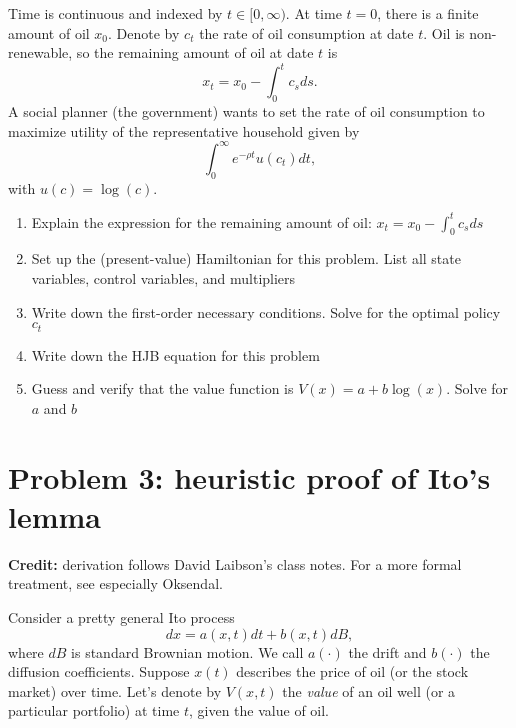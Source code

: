\documentclass[11pt]{extarticle}
\theoremstyle{plain}
\theoremstyle{definition}
\begin{document}
\vspace{5mm}
\noindent
Time is continuous and indexed by $t \in [0, \infty)$. At time $t=0$, there is a finite amount of oil $x_0$. Denote by $c_t$ the rate of oil consumption at date $t$. Oil is non-renewable, so the remaining amount of oil at date $t$ is 
\begin{equation*}
	x_t = x_0 - \int_0^t c_s ds.
\end{equation*}
A social planner (the government) wants to set the rate of oil consumption to maximize utility of the representative household given by
\begin{equation*}
	\int_0^\infty e^{- \rho t} u(c_t) dt,
\end{equation*}
with $u(c) = \log(c)$. 

\begin{enumerate}
\item Explain the expression for the remaining amount of oil: $x_t = x_0 - \int_0^t c_s ds$

\item Set up the (present-value) Hamiltonian for this problem. List all state variables, control variables, and multipliers

\item Write down the first-order necessary conditions. Solve for the optimal policy $c_t$

\item Write down the HJB equation for this problem

\item Guess and verify that the value function is $V(x) = a + b \log(x)$. Solve for $a$ and $b$
\end{enumerate}




\vspace{10mm}
\section*{Problem 3: heuristic proof of Ito's lemma}

\textbf{Credit:} derivation follows David Laibson's class notes. For a more formal treatment, see especially Oksendal. 

\vspace{5mm}
\noindent
Consider a pretty general Ito process
\begin{equation*}
	dx = a(x, t) dt + b(x, t) dB,
\end{equation*}
where $dB$ is standard Brownian motion. We call $a(\cdot)$ the drift and $b(\cdot)$ the diffusion coefficients. Suppose $x(t)$ describes the price of oil (or the stock market) over time. Let's denote by $V(x, t)$ the \textit{value} of an oil well (or a particular portfolio) at time $t$, given the value of oil. 
\end{document}
